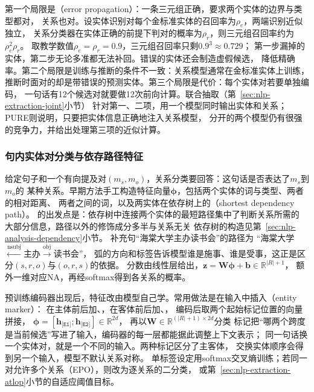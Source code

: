 第一个局限是（error propagation）：一条三元组正确，要求两个实体的边界与类型都对，
关系也对。设实体识别对每个金标准实体的召回率为$\rho_e$，两端识别近似独立，
关系分类器在实体正确的前提下判对的概率为$\rho_r$，则三元组召回率约为$\rho_e^{2}\rho_r$。
取教学数值$\rho_e=\rho_r=0.9$，三元组召回率只剩$0.9^{3}\approx0.729$；
第一步漏掉的实体，第二步无论多准都无法补回。错误的实体还会制造虚假候选，
降低精确率。第二个局限是训练与推断的条件不一致：关系模型通常在金标准实体上训练，
推断时面对的却是带错误的预测实体。第三个局限是代价：每个实体对若要单独编码，
一句话有12个候选对就要做12次前向计算。联合抽取（第~\ref{sec:nlp-extraction-joint}小节）
针对第一、二项，用一个模型同时输出实体和关系；PURE则说明，只要把实体信息正确地注入关系模型，
分开的两个模型仍有很强的竞争力，并给出处理第三项的近似计算。

\subsubsection{句内实体对分类与依存路径特征}
\label{sec:nlp-extraction-sentence-re}

给定句子和一个有向提及对$(m_s,m_o)$，关系分类要回答：这句话是否表达了$m_s$到$m_o$的
某种关系。早期方法手工构造特征向量$\bm{\phi}$，包括两个实体的词与类型、两者的相对距离、
两者之间的词，以及两实体在依存树上的（shortest dependency path）。
\citeauthor{bunescu2005shortest}的出发点是：依存树中连接两个实体的最短路径集中了判断关系所需的
大部分信息，路径以外的修饰成分多半与关系无关
依存树的构造见第~\ref{sec:nlp-analysis-dependency}小节。
补充句“海棠大学主办读书会”的路径为
“海棠大学$\xleftarrow{\text{nsubj}}$主办$\xrightarrow{\text{obj}}$读书会”，
弧的方向和标签告诉模型谁是施事、谁是受事，这正是区分$(s,r,o)$与$(o,r,s)$的依据。
分数由线性层给出，$\bm{z}=\bm{W}\bm{\phi}+\bm{b}\in\mathbb{R}^{|R|+1}$，
额外一维对应NA，再经softmax得到各关系的概率。

预训练编码器出现后，特征改由模型自己学。常用做法是在输入中插入（entity marker）：
在主体前后加\code{[E1]}、\code{[/E1]}，在客体前后加\code{[E2]}、\code{[/E2]}，
编码后取两个起始标记位置的向量拼接，
$\bm{\phi}=[\bm{h}_{\texttt{[E1]}};\bm{h}_{\texttt{[E2]}}]\in\mathbb{R}^{2d}$，
再以$\bm{W}\in\mathbb{R}^{(|R|+1)\times2d}$分类
标记把“哪两个跨度是当前候选”写进了输入，编码器的每一层都能据此调整上下文表示；
同一句话换一个实体对，就是一个不同的输入。两种标记区分了主客体，
交换实体顺序会得到另一个输入，模型不默认关系对称。
单标签设定用softmax交叉熵训练；若同一对允许多个关系（EPO），则改为逐关系的二分类，
或第~\ref{sec:nlp-extraction-atlop}小节的自适应阈值目标。

